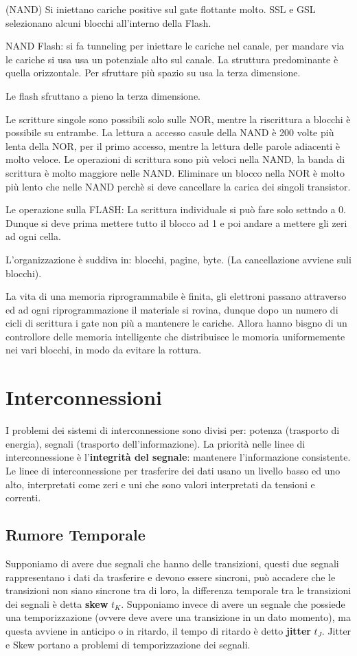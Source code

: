 \documentclass[12pt]{article}
\begin{document}
(NAND) Si iniettano cariche positive sul gate flottante molto.
SSL e GSL selezionano alcuni blocchi all'interno della Flash.

NAND Flash:
si fa tunneling per iniettare le cariche nel canale, per mandare via le cariche si usa usa un potenziale alto sul canale.
La struttura predominante \`e quella orizzontale. Per sfruttare pi\`u spazio su usa la terza dimensione.

Le flash sfruttano a pieno la terza dimensione.

Le scritture singole sono possibili solo sulle NOR, mentre la riscrittura a blocchi \`e possibile su entrambe. La lettura a accesso casule della NAND \`e 200 volte pi\`u lenta della NOR, per il primo accesso, mentre la lettura delle parole adiacenti \`e molto veloce.
Le operazioni di scrittura sono pi\`u veloci nella NAND, la banda di scrittura \`e molto maggiore nelle NAND.
Eliminare un blocco nella NOR \`e molto pi\`u lento che nelle NAND perch\`e si deve cancellare la carica dei singoli transistor.

Le operazione sulla FLASH:
La scrittura individuale si pu\`o fare solo settndo a 0. Dunque si deve prima mettere tutto il blocco ad 1 e poi andare a mettere gli zeri ad ogni cella.

L'organizzazione \`e suddiva in: blocchi, pagine, byte. (La cancellazione avviene suli blocchi).

La vita di una memoria riprogrammabile \`e finita, gli elettroni passano attraverso ed ad ogni riprogrammazione il materiale si rovina, dunque dopo un numero di cicli di scrittura i gate non pi\`u a mantenere le cariche. Allora hanno bisgno di un controllore delle memoria intelligente che distribuisce le momoria uniformemente nei vari blocchi, in modo da evitare la rottura.



\newpage
\section{Interconnessioni}
I problemi dei sistemi di interconnessione sono divisi per: potenza (trasporto di energia), segnali (trasporto dell'informazione). La priorit\`a nelle linee di interconnessione \`e l'\textbf{integrit\`a del segnale}: mantenere l'informazione consistente. Le linee di interconnessione per trasferire dei dati usano un livello basso ed uno alto, interpretati come zeri e uni che sono valori interpretati da tensioni e correnti.

\subsection{Rumore Temporale}
Supponiamo di avere due segnali che hanno delle transizioni, questi due segnali rappresentano i dati da trasferire e devono essere sincroni, pu\`o accadere che le transizioni non siano sincrone tra di loro, la differenza temporale tra le transizioni dei segnali \`e detta \textbf{skew} $t_K$. Supponiamo invece di avere un segnale che possiede una temporizzazione (ovvere deve avere una transizione in un dato momento), ma questa avviene in anticipo o in ritardo, il tempo di ritardo \`e detto \textbf{jitter} $t_J$. Jitter e Skew portano a problemi di temporizzazione dei segnali.
\end{document}
